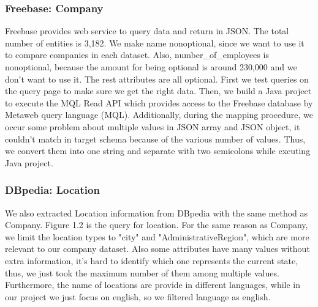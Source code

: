 
\subsubsection{Freebase: Company}
Freebase provides web service to query data and return in JSON. The total number of entities is 3,182. We make name nonoptional, since we want to use it to compare companies in each dataset. Also, number_of_employees is nonoptional, because the amount for being optional is around 230,000 and we don't want to use it. The rest attributes are all optional.
First we test queries on the query page to make sure we get the right data. Then, we build a Java project to execute the MQL Read API which provides access to the Freebase database by Metaweb query language (MQL). Additionally, during the mapping procedure, we occur some problem about multiple values in JSON array and JSON object, it couldn't match in target schema because of the various number of values. Thus, we convert them into one string and separate with two semicolons while excuting Java project.


\subsubsection{DBpedia: Location}
We also extracted Location information from DBpedia with the same method as Company. Figure 1.2 is the query for location. For the same reason as Company, we limit the location types to "city" and "AdministrativeRegion", which are more relevant to our company dataset. Also some attributes have many values without extra information, it's hard to identify which one represents the current state, thus, we just took the maximum number of them among multiple values. Furthermore, the name of locations are provide in different languages, while in our project we just focus on english, so we filtered language as english.







